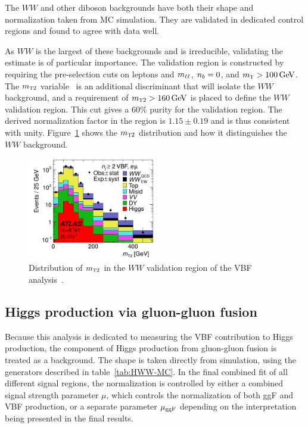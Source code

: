 The $WW$ and other diboson backgrounds have both their shape and normalization taken from MC simulation. They are validated in dedicated control regions and found to agree with data well.

As $WW$ is the largest of these backgrounds and is irreducible, validating the estimate is of particular importance. The validation region is constructed by requiring the pre-selection cuts on leptons and $m_{\ell\ell}$, $n_b = 0$, and $\mTH > 100 \GeV$. The $m_{\textrm{\footnotesize\sc t}2}$ variable~\cite{mt2} is an additional discriminant that will isolate the $WW$ background, and a requirement of $\mTtwo > 160 \GeV$ is placed to define the $WW$ validation region. This cut gives a 60\% purity for the validation region. The derived normalization factor in the region is $1.15 \pm 0.19$ and is thus consistent with unity. Figure~\ref{fig:mt2} shows the $m_{\textrm{\footnotesize\sc t}2}$ distribution and how it distinguishes the $WW$ background.

\begin{figure}[h!]
  \centering
  \captionsetup{justification=centering}
  \includegraphics[width=0.5\textwidth]{figures/VBF_mT2}
  \caption{Distribution of $m_{\textrm{\footnotesize\sc t}2}$ in the $WW$ validation region of the VBF analysis~\cite{WW2015}.}
  \label{fig:mt2}
\end{figure}

\subsection{Higgs production via gluon-gluon fusion}

Because this analysis is dedicated to measuring the VBF contribution to Higgs production, the component of Higgs production from gluon-gluon fusion is treated as a background. The shape is taken directly from simulation, using the generators described in table~\ref{tab:HWW-MC}. In the final combined fit of all different signal regions, the normalization is controlled by either a combined signal strength parameter $\mu$, which controls the normalization of both ggF and VBF production, or a separate parameter $\mu_{\rm ggF}$ depending on the interpretation being presented in the final results.  

